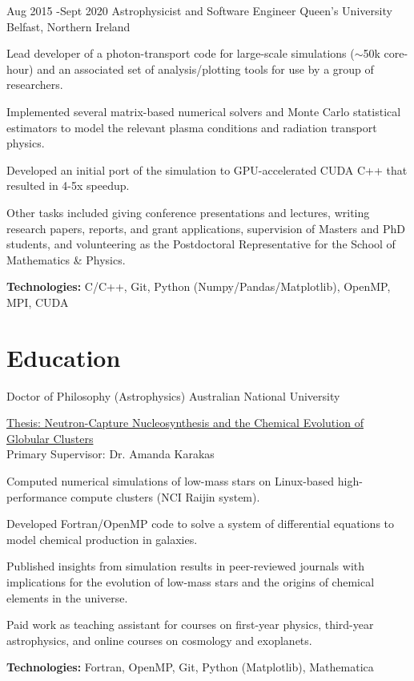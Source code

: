 \documentclass[11pt]{article} %
\begin{document}
\job
{Aug 2015 -}{Sept 2020}
{Astrophysicist and Software Engineer}
{}
{Queen's University Belfast, Northern Ireland}
{\begin{itemize-noindent}
\item{Lead developer of a photon-transport code for large-scale simulations ($\sim$50k core-hour) and an associated set of analysis/plotting tools for use by a group of researchers.}
\item{Implemented several matrix-based numerical solvers and Monte Carlo statistical estimators to model the relevant plasma conditions and radiation transport physics.}
\item{Developed an initial port of the simulation to GPU-accelerated CUDA C++ that resulted in 4-5x speedup.}
\item{Other tasks included giving conference presentations and lectures, writing research papers, reports, and grant applications, supervision of Masters and PhD students, and volunteering as the Postdoctoral Representative for the School of Mathematics \& Physics.}
\end{itemize-noindent}
\textbf{Technologies:} C/C++, Git, Python (Numpy/Pandas/Matplotlib), OpenMP, MPI, CUDA\\
}


\section{Education}

{Doctor of Philosophy (Astrophysics)}
{}{Australian National University}
{
\href{https://openresearch-repository.anu.edu.au/handle/1885/16507}{Thesis: Neutron-Capture Nucleosynthesis and the Chemical Evolution of Globular Clusters}\\
Primary Supervisor: Dr. Amanda Karakas
\begin{itemize-noindent}
  \item Computed numerical simulations of low-mass stars on Linux-based high-performance compute clusters (NCI Raijin system).
  \item Developed Fortran/OpenMP code to solve a system of differential equations to model chemical production in galaxies.
  \item Published insights from simulation results in peer-reviewed journals with implications for the evolution of low-mass stars and the origins of chemical elements in the universe.
  \item Paid work as teaching assistant for courses on first-year physics, third-year astrophysics, and online courses on cosmology and exoplanets.
\end{itemize-noindent}
\textbf{Technologies:} Fortran, OpenMP, Git, Python (Matplotlib), Mathematica
}
\end{document}
